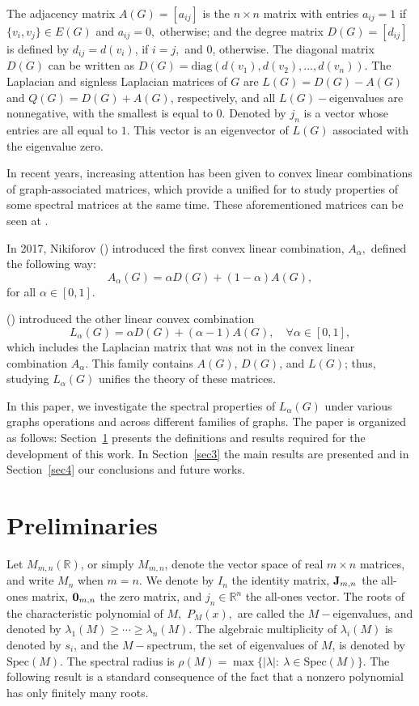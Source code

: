 \documentclass{article}
\newcommand{\bigzero}{\mbox{\normalfont\bfseries 0}}
\newcommand{\bigjota}{\mbox{\normalfont\bfseries J}}
\begin{document}
The adjacency matrix $A(G)=[a_{ij}]$ is the $n \times n$ matrix with entries $a_{ij}=1$ if $\{v_i,v_j\}\in E(G)$ and $a_{ij}=0,$ otherwise;
and the degree matrix $D(G)=[d_{ij}]$ is defined by $ d_{ij}= d(v_i)$,  if  $i=j,$ and $0$, otherwise. The diagonal matrix $D(G)$ can be written as $D(G)=\mathrm{diag}(d(v_1), d(v_2), \ldots, d(v_n))$. The Laplacian and signless Laplacian matrices of $G$ are $L(G)=D(G)-A(G)$ and $Q(G)=D(G)+A(G)$, respectively, and all $L(G)-$eigenvalues are nonnegative, with the smallest is equal to $0$. 
Denoted by $j_n$ is a vector whose entries are all equal to $1$. This vector is an eigenvector of $L(G)$ associated with the eigenvalue zero.

In recent years, increasing attention has been given to convex linear combinations of graph-associated matrices, which provide a unified for to study properties of some spectral matrices at the same time. These aforementioned matrices can be seen at \cite{Wang2020, Nikiforov2017, CUI20191, Samanta2024}.

In 2017, Nikiforov (\cite{Nikiforov2017}) introduced the first convex linear combination, $A_{\alpha},$ defined the following way:
\[
A_\alpha(G) = \alpha D(G) + (1-\alpha)A(G),
\]
for all $\alpha \in [0,1]$. 

\citeauthor{Wang2020} (\cite{Wang2020}) introduced the other linear convex combination
\[
L_\alpha(G) = \alpha D(G) + (\alpha - 1)A(G), \quad \forall \alpha \in [0,1],
\]
which includes the Laplacian matrix that was not in the convex linear combination $A_{\alpha}$. This family contains $A(G)$, $D(G)$, and $L(G)$; thus, studying $L_\alpha(G)$ unifies the theory of these matrices.

In this paper, we investigate the spectral properties of  $L_\alpha(G)$ under various graphs operations and across different families of graphs. The paper is organized as follows: Section~\ref{sec2} presents the definitions and results required for the development of this work. In Section~\ref{sec3} the main results are presented and in Section~\ref{sec4} our conclusions and future works.

\section{Preliminaries}\label{sec2}

Let \( M_{m,n}(\mathbb{R}) \), or simply \( M_{m,n} \), denote the vector space of real \( m \times n \) matrices, and write \( M_n \) when \( m=n \). We denote by \( I_n \) the identity matrix, \( \bigjota_{m,n} \) the all-ones matrix, \( \bigzero_{m,n} \) the zero matrix, and \( j_n \in \mathbb{R}^n \) the all-ones vector. The roots of the characteristic polynomial of $M,$ $P_M(x),$ are called the $M-$eigenvalues,
and denoted by \( \lambda_1(M) \ge \cdots \ge \lambda_n(M) \). The algebraic multiplicity of \( \lambda_i(M) \) is denoted by \( s_i \), and the $M-$spectrum, the set of eigenvalues of $M$, is denoted by \( \mathrm{Spec}(M) \). The spectral radius is $\rho(M)=\max\{|\lambda|:\ \lambda \in \mathrm{Spec}(M)\}.$ The following result is a standard consequence of the fact that a nonzero polynomial has only finitely many roots.
\end{document}
